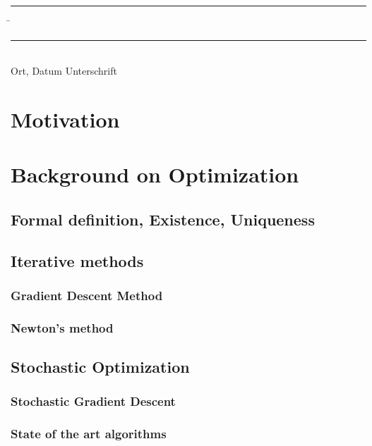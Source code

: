 \documentclass[12pt]{article}
\theoremstyle{definition}
\numberwithin{equation}{section}
\begin{document}
\vspace*{3em}

\begin{tabbing}
  \rule{.4\textwidth}{1pt} \hspace*{.2\textwidth}
  \= \rule{.4\textwidth}{1pt} \\
  Ort, Datum \> Unterschrift
\end{tabbing}

\newpage
\mbox{}
\newpage
\tableofcontents
\newpage
\listoffigures
\newpage

\section{Motivation}
\label{sec:Motivation}

\section{Background on Optimization}
\label{sec:Optimization}

\subsection{Formal definition, Existence, Uniqueness}
\subsection{Iterative methods}
\subsubsection{Gradient Descent Method}
\subsubsection{Newton's method}
\subsection{Stochastic Optimization}
\label{sec:StochasticOptimization}
\subsubsection{Stochastic Gradient Descent}

\subsubsection{State of the art algorithms}
\label{sec:StateOfTheArtAlgorithms}
\end{document}
